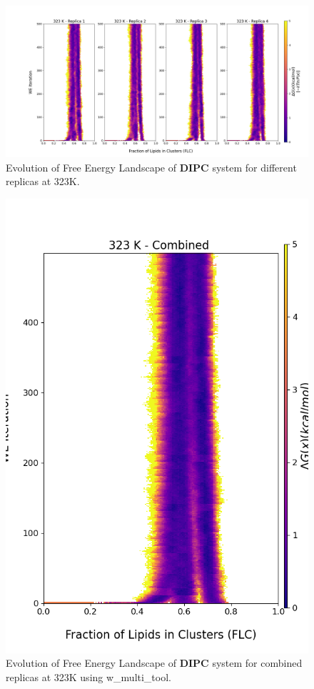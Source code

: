 \documentclass{biophys-new}
\begin{document}
\begin{figure}[hbt!]
\centering
\includegraphics[width=1.1\linewidth]{all_plots/ClusterLipids2Total/DPPC_DIPC_CHOL/323K/Evolution_DIPC_323_ClusterLipids2Total.png}
\caption{Evolution of Free Energy Landscape of \textbf{DIPC} system for different replicas at 323K.}
\label{fig:view}

\end{figure}

\begin{figure}[hbt!]
\centering
\includegraphics[width=0.8\linewidth]{all_plots/ClusterLipids2Total/DPPC_DIPC_CHOL/323K/Evolution_DIPC_MULTI__323_ClusterLipids2Total.png}
\caption{Evolution of Free Energy Landscape of \textbf{DIPC} system for combined replicas at 323K using w\_multi\_tool.}
\label{fig:view}

\end{figure}
\end{document}
